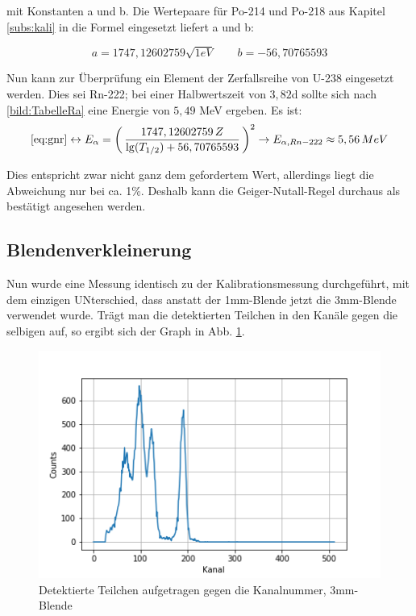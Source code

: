 mit Konstanten a und b. Die Wertepaare für Po-214 und Po-218 aus Kapitel \ref{subs:kali} in die Formel eingesetzt liefert a und b:

\begin{equation}
    a = 1747,12602759 \sqrt{1eV} \qquad b = -56,70765593
\end{equation}

Nun kann zur Überprüfung ein Element der Zerfallsreihe von U-238 eingesetzt werden. Dies sei Rn-222; bei einer Halbwertszeit von 
$3,82$d sollte sich nach \ref{bild:TabelleRa} eine Energie von $5,49$ MeV ergeben. Es ist: \\

\begin{equation*}
    \ref{eq:gnr}  \leftrightarrow E_{\alpha} = \biggl(\,\frac{1747,12602759 \, Z}{\lg(T_{1/2})+56,70765593}\, \biggr)^2 \\
    \to E_{\alpha, Rn-222} \approx 5,56 \, MeV
\end{equation*}

Dies entspricht zwar nicht ganz dem gefordertem Wert, allerdings liegt die Abweichung nur bei ca. 1\%. Deshalb kann die 
Geiger-Nutall-Regel durchaus als bestätigt angesehen werden.

\subsection{Blendenverkleinerung}

Nun wurde eine Messung identisch zu der Kalibrationsmessung durchgeführt, mit dem einzigen UNterschied, dass anstatt der 1mm-Blende 
jetzt die 3mm-Blende verwendet wurde. Trägt man die detektierten Teilchen in den Kanäle gegen die selbigen auf, so ergibt sich der 
Graph in Abb. \ref{bild:blende}. \\

\begin{figure}[h]
    \centering
    \includegraphics[scale=0.65]{Bilder/blende.png}
    \caption{Detektierte Teilchen aufgetragen gegen die Kanalnummer, 3mm-Blende}
    \label{bild:blende}
\end{figure}

